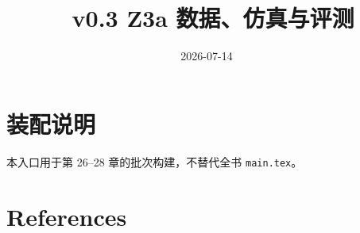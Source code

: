 \documentclass[UTF8,a4paper,12pt,openany]{ctexbook}
\title{\ReportTitle\ v0.3 Z3a 数据、仿真与评测}
\author{\ReportAuthor}
\date{2026-07-14}
\begin{document}
\frontmatter
\maketitle
\chapter*{装配说明}
本入口用于第 26--28 章的批次构建，不替代全书 \texttt{main.tex}。
\tableofcontents
\mainmatter
\setcounter{chapter}{25}



\backmatter
\chapter{References}
\printbibliography[heading=none]
\end{document}
